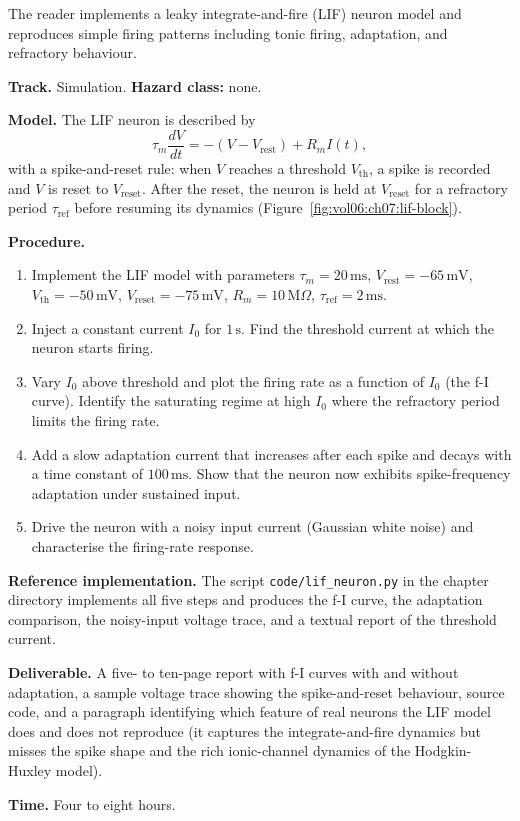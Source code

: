 \begin{project}
The reader implements a leaky integrate-and-fire (LIF) neuron model
and reproduces simple firing patterns including tonic firing,
adaptation, and refractory behaviour.

\textbf{Track.} Simulation.
\textbf{Hazard class:} none.

\textbf{Model.} The LIF neuron is described by
\[
\tau_m \frac{dV}{dt} = -(V - V_{\text{rest}}) + R_m I(t),
\]
with a spike-and-reset rule: when $V$ reaches a threshold
$V_{\text{th}}$, a spike is recorded and $V$ is reset to
$V_{\text{reset}}$. After the reset, the neuron is held at
$V_{\text{reset}}$ for a refractory period $\tau_{\text{ref}}$ before
resuming its dynamics
(Figure~\ref{fig:vol06:ch07:lif-block}).



\textbf{Procedure.}

\begin{enumerate}[leftmargin=*]
\item Implement the LIF model with parameters $\tau_m = 20\,\text{ms}$,
  $V_{\text{rest}} = -65\,\text{mV}$, $V_{\text{th}} = -50\,\text{mV}$,
  $V_{\text{reset}} = -75\,\text{mV}$, $R_m = 10\,\text{M}\Omega$,
  $\tau_{\text{ref}} = 2\,\text{ms}$.
\item Inject a constant current $I_0$ for $1\,\text{s}$. Find the
  threshold current at which the neuron starts firing.
\item Vary $I_0$ above threshold and plot the firing rate as a
  function of $I_0$ (the f-I curve). Identify the saturating regime
  at high $I_0$ where the refractory period limits the firing rate.
\item Add a slow adaptation current that increases after each spike
  and decays with a time constant of $100\,\text{ms}$. Show that the
  neuron now exhibits spike-frequency adaptation under sustained
  input.
\item Drive the neuron with a noisy input current (Gaussian
  white noise) and characterise the firing-rate response.
\end{enumerate}

\textbf{Reference implementation.} The script
\verb|code/lif_neuron.py| in the chapter directory implements all
five steps and produces the f-I curve, the adaptation comparison,
the noisy-input voltage trace, and a textual report of the threshold
current.

\textbf{Deliverable.} A five- to ten-page report with f-I curves with
and without adaptation, a sample voltage trace showing the
spike-and-reset behaviour, source code, and a paragraph identifying
which feature of real neurons the LIF model does and does not
reproduce (it captures the integrate-and-fire dynamics but misses the
spike shape and the rich ionic-channel dynamics of the Hodgkin-Huxley
model).

\textbf{Time.} Four to eight hours.
\end{project}

